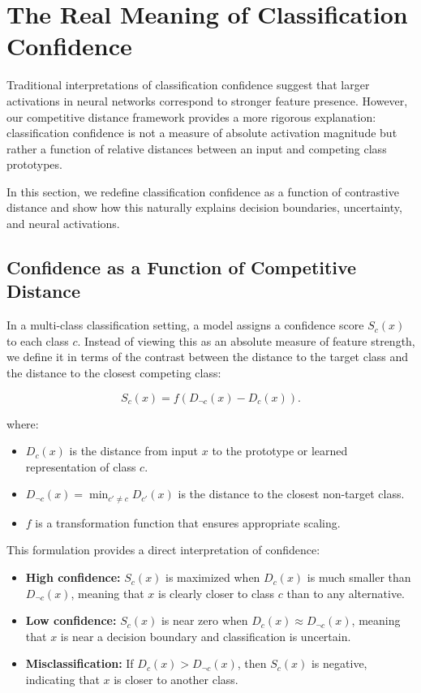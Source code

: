 \section{The Real Meaning of Classification Confidence}

Traditional interpretations of classification confidence suggest that larger activations in neural networks correspond to stronger feature presence. However, our competitive distance framework provides a more rigorous explanation: classification confidence is not a measure of absolute activation magnitude but rather a function of relative distances between an input and competing class prototypes. 

In this section, we redefine classification confidence as a function of contrastive distance and show how this naturally explains decision boundaries, uncertainty, and neural activations.

\subsection{Confidence as a Function of Competitive Distance}

In a multi-class classification setting, a model assigns a confidence score \( S_c(x) \) to each class \( c \). Instead of viewing this as an absolute measure of feature strength, we define it in terms of the contrast between the distance to the target class and the distance to the closest competing class:

\[
S_c(x) = f(D_{\neg c}(x) - D_c(x)).
\]

where:

\begin{itemize}
    \item \( D_c(x) \) is the distance from input \( x \) to the prototype or learned representation of class \( c \).
    \item \( D_{\neg c}(x) = \min_{c' \neq c} D_{c'}(x) \) is the distance to the closest non-target class.
    \item \( f \) is a transformation function that ensures appropriate scaling.
\end{itemize}

This formulation provides a direct interpretation of confidence:

\begin{itemize}
    \item \textbf{High confidence:} \( S_c(x) \) is maximized when \( D_c(x) \) is much smaller than \( D_{\neg c}(x) \), meaning that \( x \) is clearly closer to class \( c \) than to any alternative.
    \item \textbf{Low confidence:} \( S_c(x) \) is near zero when \( D_c(x) \approx D_{\neg c}(x) \), meaning that \( x \) is near a decision boundary and classification is uncertain.
    \item \textbf{Misclassification:} If \( D_c(x) > D_{\neg c}(x) \), then \( S_c(x) \) is negative, indicating that \( x \) is closer to another class.
\end{itemize}

